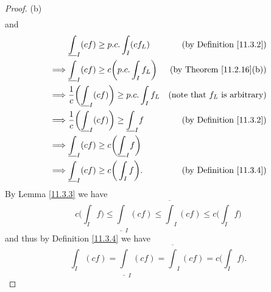 \begin{proof}{(b)}
\begin{align*}
    \end{align*}
    and
    \begin{align*}
                 & \underline{\int}_I (cf) \geq p.c. \int_I (c f_L)                          & \text{(by Definition \ref{11.3.2})}     \\
        \implies & \underline{\int}_I (cf) \geq c \bigg(p.c. \int_I f_L\bigg)                & \text{(by Theorem \ref{11.2.16}(b))}    \\
        \implies & \frac{1}{c} \bigg(\underline{\int}_I (cf)\bigg) \geq p.c. \int_I f_L      & \text{(note that \(f_L\) is arbitrary)} \\
        \implies & \frac{1}{c} \bigg(\underline{\int}_I (cf)\bigg) \geq \underline{\int}_I f & \text{(by Definition \ref{11.3.2})}     \\
        \implies & \underline{\int}_I (cf) \geq c\bigg(\underline{\int}_I f\bigg)                                                      \\
        \implies & \underline{\int}_I (cf) \geq c\bigg(\int_I f\bigg).                       & \text{(by Definition \ref{11.3.4})}
    \end{align*}
    By Lemma \ref{11.3.3} we have
    \[
        c\bigg(\int_I f\bigg) \leq \underline{\int}_I (cf) \leq \overline{\int}_I (cf) \leq c\bigg(\int_I f\bigg)
    \]
    and thus by Definition \ref{11.3.4} we have
    \[
        \int_I (cf) = \underline{\int}_I (cf) = \overline{\int}_I (cf) = c\bigg(\int_I f\bigg).
    \]


\end{proof}
